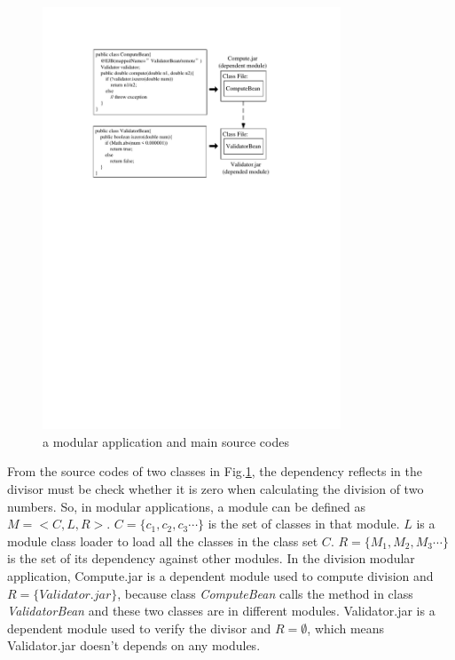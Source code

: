 \documentclass[conference]{IEEEtran}
\begin{document}
\begin{figure}[ht]
\centering
\includegraphics[width=3.5in]{ExampleEJB.pdf}
\caption{a modular application and main source codes}
\label{fig:example}
\end{figure}

From the source codes of two classes in Fig.\ref{fig:example}, the dependency reflects in the divisor must be check whether it is zero when calculating the division of two numbers.
So, in modular applications, a module can be defined as $M=<C, L, R>$. 
$C=\{c_1, c_2, c_3\cdots\}$ is the set of classes in that module. 
$L$ is a module class loader to load all the classes in the class set $C$.
$R=\{M_1, M_2, M_3\cdots\}$ is the set of its dependency against other modules. 
In the division modular application, Compute.jar is a dependent module used to compute division and $R = \{Validator.jar\}$, because class \emph{ComputeBean} calls the method in class \emph{ValidatorBean} and these two classes are in different modules.
Validator.jar is a dependent module used to verify the divisor and $R = \emptyset$, which means Validator.jar doesn’t depends on any modules.
\end{document}
